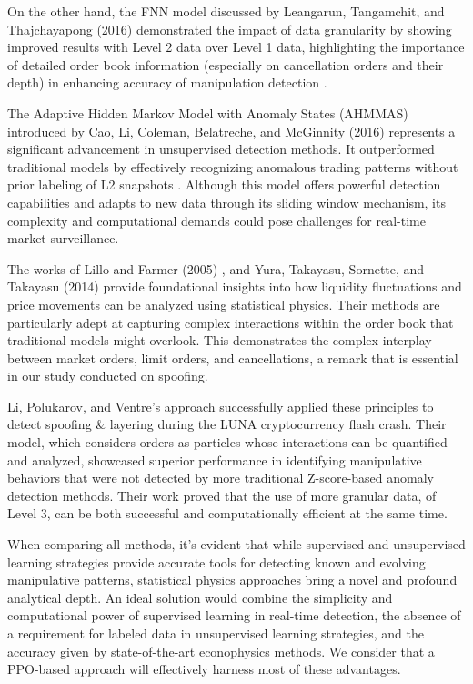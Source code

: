 \documentclass[conference]{IEEEtran}
\begin{document}
\par On the other hand, the FNN model discussed by Leangarun, Tangamchit, and Thajchayapong (2016) \cite{Leang_2016} demonstrated the impact of data granularity by showing improved results with Level 2 data over Level 1 data, highlighting the importance of detailed order book information (especially on cancellation orders and their depth) in enhancing accuracy of manipulation detection \cite{Leang_2016}.

\par The Adaptive Hidden Markov Model with Anomaly States (AHMMAS) introduced by Cao, Li, Coleman, Belatreche, and McGinnity (2016) \cite{Cao_2015} represents a significant advancement in unsupervised detection methods. It outperformed traditional models by effectively recognizing anomalous trading patterns without prior labeling of L2 snapshots \cite{Cao_2015}. Although this model offers powerful detection capabilities and adapts to new data through its sliding window mechanism, its complexity and computational demands could pose challenges for real-time market surveillance.

\par The works of Lillo and Farmer (2005) \cite{Lillo_2005}, and Yura, Takayasu, Sornette, and Takayasu (2014) \cite{Yura_2014} provide foundational insights into how liquidity fluctuations and price movements can be analyzed using statistical physics. Their methods are particularly adept at capturing complex interactions within the order book that traditional models might overlook. This demonstrates the complex interplay between market orders, limit orders, and cancellations, a remark that is essential in our study conducted on spoofing.

\par Li, Polukarov, and Ventre's approach \cite{Li_2023} successfully applied these principles to detect spoofing \& layering during the LUNA cryptocurrency flash crash. Their model, which considers orders as particles whose interactions can be quantified and analyzed, showcased superior performance in identifying manipulative behaviors that were not detected by more traditional Z-score-based anomaly detection methods. Their work proved that the use of more granular data, of Level 3, can be both successful and computationally efficient at the same time.

\par When comparing all methods, it's evident that while supervised and unsupervised learning strategies provide accurate tools for detecting known and evolving manipulative patterns, statistical physics approaches bring a novel and profound analytical depth. An ideal solution would combine the simplicity and computational power of supervised learning in real-time detection, the absence of a requirement for labeled data in unsupervised learning strategies, and the accuracy given by state-of-the-art econophysics methods. We consider that a PPO-based approach will effectively harness most of these advantages.
\end{document}
